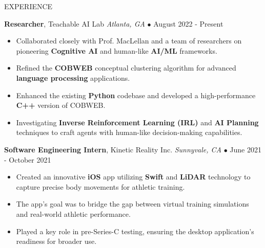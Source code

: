 \documentclass{resume} %
\begin{document}
\begin{rSection}{EXPERIENCE}
\vspace{-1mm}

\textbf{Researcher}, Teachable AI Lab \hfill \textit{Atlanta, GA} $\bullet$ August 2022 - Present
\vspace{-2mm}
\begin{itemize}
\itemsep -6pt {}

            \item Collaborated closely with Prof. MacLellan and a team of researchers on pioneering \textbf{Cognitive AI} and human-like \textbf{AI/ML} frameworks.\n
            \item Refined the \textbf{COBWEB} conceptual clustering algorithm for advanced \textbf{language processing} applications.\n
            \item Enhanced the existing \textbf{Python} codebase and developed a high-performance \textbf{C++} version of COBWEB.\n
            \item Investigating \textbf{Inverse Reinforcement Learning (IRL)} and \textbf{AI Planning} techniques to craft agents with human-like decision-making capabilities.
        \end{itemize}

\vspace{-1mm}

\textbf{Software Engineering Intern}, Kinetic Reality Inc. \hfill \textit{Sunnyvale, CA} $\bullet$ June 2021 - October 2021
\vspace{-2mm}
\begin{itemize}
\itemsep -6pt {}

            \item Created an innovative \textbf{iOS} app utilizing \textbf{Swift} and \textbf{LiDAR} technology to capture precise body movements for athletic training.\n
            \item The app's goal was to bridge the gap between virtual training simulations and real-world athletic performance.\n
            \item Played a key role in pre-Series-C testing, ensuring the desktop application's readiness for broader use.
        \end{itemize}

\end{rSection}


\end{document}

